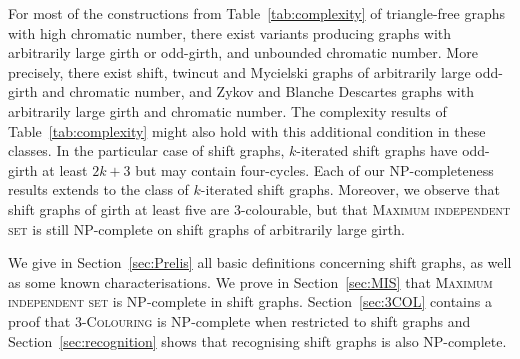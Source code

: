 \documentclass[11pt,a4aper]{article}
\newcommand{\defin}[1]{\emph{\textcolor{ForestGreen}{#1}}}
\begin{document}
For most of the constructions from Table~\ref{tab:complexity} of triangle-free graphs
with high chromatic number, there exist variants producing graphs with
arbitrarily large girth or odd-girth, and unbounded chromatic number. More
precisely, there exist shift, twincut and Mycielski graphs of arbitrarily
large odd-girth and chromatic number, and Zykov and Blanche Descartes graphs
with arbitrarily large girth and chromatic number. The complexity results of
Table~\ref{tab:complexity} might also hold with this additional condition in these
classes. In the particular case of shift graphs, $k$-iterated shift graphs have
odd-girth at least $2k+3$ but may contain four-cycles. Each of our
NP-completeness results extends to the class of $k$-iterated shift graphs.
Moreover, we observe that shift graphs of girth at least five are 3-colourable,
but that \textsc{Maximum independent set} is still NP-complete on shift graphs of
arbitrarily large girth.  



We give in Section~\ref{sec:Prelis} all basic definitions concerning shift graphs, as well as some known characterisations. 
We prove in Section~\ref{sec:MIS} that \textsc{Maximum independent set} is
NP-complete in shift graphs. Section~\ref{sec:3COL} contains a proof that \textsc{3-Colouring}
is NP-complete when restricted to shift graphs and Section~\ref{sec:recognition} shows
that recognising shift graphs is also NP-complete.
\end{document}
